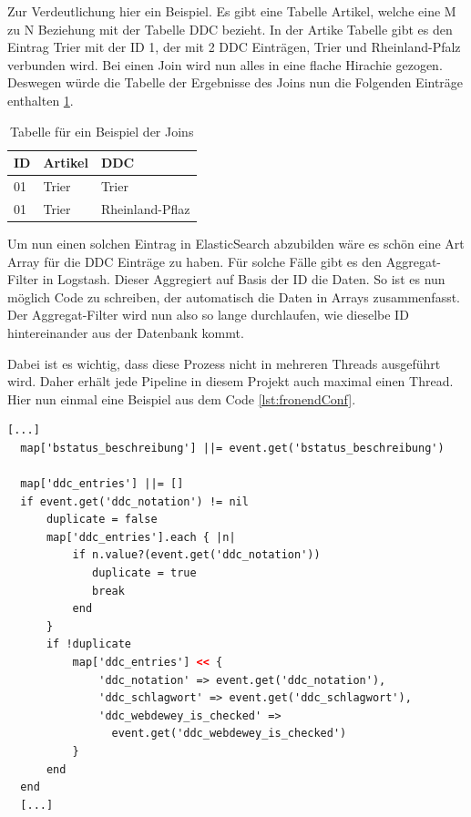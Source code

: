 Zur Verdeutlichung hier ein Beispiel.
Es gibt eine Tabelle Artikel, welche eine M zu N Beziehung mit der Tabelle DDC bezieht. In der Artike Tabelle gibt es den Eintrag Trier mit der ID 1, der mit 2 DDC Einträgen, Trier und Rheinland-Pfalz verbunden wird. Bei einen Join wird nun alles in eine flache Hirachie gezogen. Deswegen würde die Tabelle der Ergebnisse des Joins nun die Folgenden Einträge enthalten \ref{tbl:join}.

\begin{table} %
	\centering
		\begin{tabular}{l | l | l}
		    \textbf{ID} & \textbf{Artikel} & \textbf{DDC} \\
        \hline
        01 & Trier & Trier \\
        01 & Trier & Rheinland-Pflaz  \\
		\end{tabular}
    \caption{Tabelle für ein Beispiel der Joins}
    \label{tbl:join}
\end{table}

Um nun einen solchen Eintrag in ElasticSearch abzubilden wäre es schön eine Art Array für die DDC Einträge zu haben. Für solche Fälle gibt es den Aggregat-Filter in Logstash. Dieser Aggregiert auf Basis der ID die Daten. So ist es nun möglich Code zu schreiben, der automatisch die Daten in Arrays zusammenfasst. Der Aggregat-Filter wird nun also so lange durchlaufen, wie dieselbe ID hintereinander aus der Datenbank kommt. 

Dabei ist es wichtig, dass diese Prozess nicht in mehreren Threads ausgeführt wird. Daher erhält jede Pipeline in diesem Projekt auch maximal einen Thread.
Hier nun einmal eine Beispiel aus dem Code \ref{lst:fronendConf}.


\begin{lstlisting}[language=XML, frame=single, label={lst:fronendConf}] 
  [...]
  map['bstatus_beschreibung'] ||= event.get('bstatus_beschreibung')

  map['ddc_entries'] ||= []
  if event.get('ddc_notation') != nil
      duplicate = false
      map['ddc_entries'].each { |n|
          if n.value?(event.get('ddc_notation'))
             duplicate = true
             break
          end
      }
      if !duplicate
          map['ddc_entries'] << {
              'ddc_notation' => event.get('ddc_notation'),
              'ddc_schlagwort' => event.get('ddc_schlagwort'),
              'ddc_webdewey_is_checked' => 
                event.get('ddc_webdewey_is_checked')
          }
      end
  end
  [...]
\end{lstlisting}

